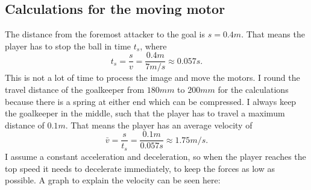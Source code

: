 \subsection{Calculations for the moving motor}\label{subsec:moving_motor}
The distance from the foremost attacker to the goal is $s=0.4m$.
That means the player has to stop the ball in time $t_s$, where
\begin{equation}
    \label{eq:stopping_time}
    t_s = \frac{s}{v} = \frac{0.4m}{7m/s} \approx 0.057 s.
\end{equation}
This is not a lot of time to process the image and move the motors.
I round the travel distance of the goalkeeper from $180mm$ to $200mm$ for the calculations because there is a spring at either end which can be compressed.
I always keep the goalkeeper in the middle, such that the player has to travel a maximum distance of $0.1m$.
That means the player has an average velocity of
\begin{equation}
    \label{eq:average_velocity}
    \bar{v} = \frac{s}{t_s} = \frac{0.1m}{0.057s} \approx 1.75m/s.
\end{equation}
I assume a constant acceleration and deceleration, so when the player reaches the top speed it needs to decelerate immediately, to keep the forces as low as possible.
A graph to explain the velocity can be seen here:

\begin{center}
\end{center}

